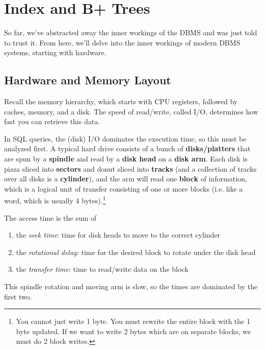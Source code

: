 \documentclass{article}
\begin{document}
\section{Index and B+ Trees} 

    So far, we've abstracted away the inner workings of the DBMS and was just told to trust it. From here, we'll delve into the inner workings of modern DBMS systems, starting with hardware.   

  \subsection{Hardware and Memory Layout}

    Recall the memory hierarchy, which starts with CPU registers, followed by caches, memory, and a disk. The speed of read/write, called I/O, determines how fast you can retrieve this data. 

    \begin{definition}
      In SQL queries, the (disk) I/O dominates the execution time, so this must be analyzed first. A typical hard drive consists of a bunch of \textbf{disks/platters} that are spun by a \textbf{spindle} and read by a \textbf{disk head} on a \textbf{disk arm}. Each disk is pizza sliced into \textbf{sectors} and donut sliced into \textbf{tracks} (and a collection of tracks over all disks is a \textbf{cylinder}), and the arm will read one \textbf{block} of information, which is a logical unit of transfer consisting of one or more blocks (i.e. like a word, which is usually 4 bytes).\footnote{You cannot just write 1 byte. You must rewrite the entire block with the 1 byte updated. If we want to write 2 bytes which are on separate blocks, we must do 2 block writes.} 
    \end{definition}

    \begin{definition}
      The access time is the sum of 
      \begin{enumerate}
        \item the \textit{seek time}: time for disk heads to move to the correct cylinder 
        \item the \textit{rotational delay}: time for the desired block to rotate under the disk head 
        \item the \textit{transfer time}: time to read/write data on the block
      \end{enumerate}
      This spindle rotation and moving arm is slow, so the times are dominated by the first two. 
    \end{definition}
\end{document}
